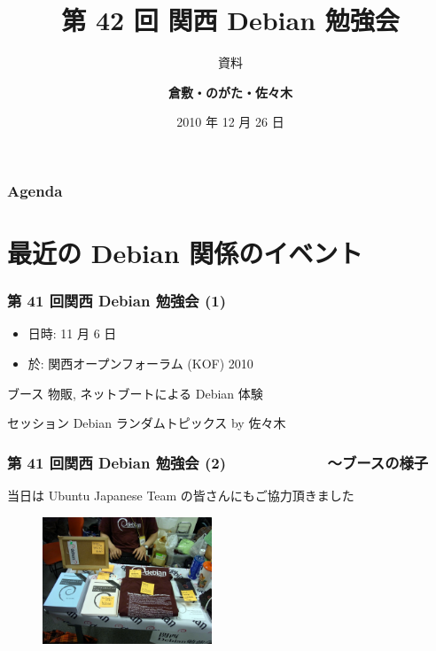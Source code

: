 \documentclass[cjk,dvipdfmx,12pt,%
hyperref={bookmarks=true,bookmarksnumbered=true,bookmarksopen=false,%
colorlinks=false,%
pdftitle={第 42 回 関西 Debian 勉強会},%
pdfauthor={倉敷・のがた・佐々木},%
pdfsubject={資料},%
}]{beamer}
\title{第 42 回 関西 Debian 勉強会}
\subtitle{{\scriptsize 資料}}
\author[佐々木 洋平]{{\large\bf 倉敷・のがた・佐々木}}
\institute[Debian JP]{{\normalsize\tt 関西 Debian 勉強会}}
\date{{\small 2010 年 12 月 26 日}}
\begin{document}
\settitleslide
\begin{frame}
\titlepage
\end{frame}
\setdefaultslide

\begin{frame}[fragile]
\frametitle{Agenda}

\tableofcontents

\end{frame}

\section{最近の Debian 関係のイベント}


 

\begin{frame}[fragile]
\frametitle{第 41 回関西 Debian 勉強会 (1)}

\begin{itemize}
\item 日時: 11 月 6 日
\item 於: 関西オープンフォーラム (KOF) 2010
\end{itemize}

\begin{block}{ブース}
  物販, ネットブートによる Debian 体験
\end{block}
\begin{block}{セッション}
  Debian ランダムトピックス by 佐々木
\end{block}


\end{frame}
\begin{frame}[fragile]
\frametitle{第 41 回関西 Debian 勉強会 (2)　　　　　　　〜ブースの様子}

当日は Ubuntu Japanese Team の皆さんにもご協力頂きました

\begin{figure}[h]
    \centering
    \includegraphics[width=0.45\textwidth]{image201012/kof1.jpg}
 \end{figure}


\end{frame}
\end{document}
